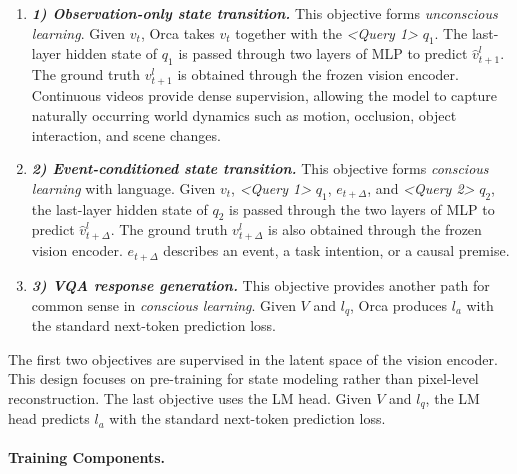 \vspace{-1ex}
\begin{enumerate}[leftmargin=1.35em, itemsep=0.35em, topsep=0.35em, parsep=0em]
    \item[] \textbf{\textit{1) Observation-only state transition.}} This objective forms \textit{unconscious learning}. Given \(v_t\), Orca takes \(v_t\) together with the \textit{<Query 1>} \(q_1\). The last-layer hidden state of \(q_1\) is passed through two layers of MLP to predict $\hat{v}^l_{t+1}$. The ground truth $v^l_{t+1}$ is obtained through the frozen vision encoder. Continuous videos provide dense supervision, allowing the model to capture naturally occurring world dynamics such as motion, occlusion, object interaction, and scene changes.
  
    \item[] \textbf{\textit{2) Event-conditioned state transition.}} This objective forms \textit{conscious learning} with language. Given \(v_t\), \textit{<Query 1>} \(q_1\), $e_{t+\Delta}$, and \textit{<Query 2>} \(q_2\), the last-layer hidden state of \(q_2\) is passed through the two layers of MLP to predict $\hat{v}^l_{t+\Delta}$. The ground truth $v^l_{t+\Delta}$ is also obtained through the frozen vision encoder. $e_{t+\Delta}$ describes an event, a task intention, or a causal premise. 

    \item[] \textbf{\textit{3) VQA response generation.}} This objective provides another path for common sense in \textit{conscious learning}. Given $V$ and $l_q$, Orca produces $l_a$ with the standard next-token prediction loss.
\end{enumerate}

The first two objectives are supervised in the latent space of the vision encoder. This design focuses on pre-training for state modeling rather than pixel-level reconstruction. The last objective uses the LM head. Given $V$ and $l_q$, the LM head predicts $l_a$ with the standard next-token prediction loss. 



\paragraph{Training Components.}

